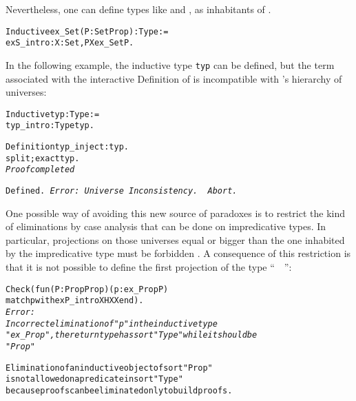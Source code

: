 \documentclass[11pt]{article}
\begin{document}
Nevertheless, one can define types like  and , as inhabitants of .

\begin{alltt}
Inductive ex_Set  (P : Set {\arrow} Prop) : Type :=
  exS_intro : {\prodsym} X : Set, P X {\arrow} ex_Set P.
\end{alltt}

In the following example, the inductive type \texttt{typ} can be defined,
but the term associated with the interactive Definition of
 is incompatible with {\coq}'s hierarchy of universes:


\begin{alltt}
Inductive  typ : Type := 
  typ_intro : Type {\arrow} typ. 

Definition typ_inject: typ.
 split; exact typ.
\it Proof completed

\tt{}Defined.
\it Error: Universe Inconsistency.
\tt
Abort.
\end{alltt}

One possible way of avoiding this new source of paradoxes is to
restrict the kind of eliminations by case analysis that can be done on
impredicative types. In particular, projections on those universes
equal or bigger than the one inhabited by the impredicative type must
be forbidden \cite{Coq86}. A consequence of this restriction is that it
is not possible to define the first projection of the type
``~~'':
\begin{alltt}
Check (fun (P:Prop{\arrow}Prop)(p: ex_Prop P) {\funarrow}
      match p with exP_intro X HX {\funarrow} X end).
\it
Error:
Incorrect elimination of "p" in the inductive type  
"ex_Prop", the return type has sort "Type" while it should be 
"Prop"

Elimination of an inductive object of sort "Prop"
is not allowed on a predicate in sort "Type"
because proofs can be eliminated only to build proofs.
\end{alltt}

%
%
\end{document}
